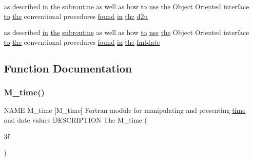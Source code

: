 \begin{DoxyCompactItemize}
\item 
as described \hyperlink{M__journal_83_8txt_afce72651d1eed785a2132bee863b2f38}{in} \hyperlink{M__stopwatch_83_8txt_a0f266597de2e57eb3aa964927bb30e14}{the} \hyperlink{M__stopwatch_83_8txt_acfbcff50169d691ff02d4a123ed70482}{subroutine} as well as how \hyperlink{M__stopwatch_83_8txt_a97209fd3e34ef701c0a9734280779cbb}{to} \hyperlink{intro__blas1_83_8txt_a04fa2694d85f67a675bb3f45f7241f48}{use} \hyperlink{M__stopwatch_83_8txt_a0f266597de2e57eb3aa964927bb30e14}{the} Object Oriented interface \hyperlink{M__stopwatch_83_8txt_a97209fd3e34ef701c0a9734280779cbb}{to} \hyperlink{M__stopwatch_83_8txt_a0f266597de2e57eb3aa964927bb30e14}{the} conventional procedures \hyperlink{what__overview_81_8txt_a4a5cd559ce9a19bdc777ce034bc845d1}{found} \hyperlink{M__journal_83_8txt_afce72651d1eed785a2132bee863b2f38}{in} \hyperlink{M__stopwatch_83_8txt_a0f266597de2e57eb3aa964927bb30e14}{the} \hyperlink{M__time_83_8txt_ab56b0f002a88dac7ff0ec59238e7aad2}{d2u}
\item 
as described \hyperlink{M__journal_83_8txt_afce72651d1eed785a2132bee863b2f38}{in} \hyperlink{M__stopwatch_83_8txt_a0f266597de2e57eb3aa964927bb30e14}{the} \hyperlink{M__stopwatch_83_8txt_acfbcff50169d691ff02d4a123ed70482}{subroutine} as well as how \hyperlink{M__stopwatch_83_8txt_a97209fd3e34ef701c0a9734280779cbb}{to} \hyperlink{intro__blas1_83_8txt_a04fa2694d85f67a675bb3f45f7241f48}{use} \hyperlink{M__stopwatch_83_8txt_a0f266597de2e57eb3aa964927bb30e14}{the} Object Oriented interface \hyperlink{M__stopwatch_83_8txt_a97209fd3e34ef701c0a9734280779cbb}{to} \hyperlink{M__stopwatch_83_8txt_a0f266597de2e57eb3aa964927bb30e14}{the} conventional procedures \hyperlink{what__overview_81_8txt_a4a5cd559ce9a19bdc777ce034bc845d1}{found} \hyperlink{M__journal_83_8txt_afce72651d1eed785a2132bee863b2f38}{in} \hyperlink{M__stopwatch_83_8txt_a0f266597de2e57eb3aa964927bb30e14}{the} \hyperlink{M__time_83_8txt_ad50a7c3c69e1d5931a0518d62cff1ee8}{fmtdate}
\end{DoxyCompactItemize}


\subsection{Function Documentation}
\mbox{\label{M__time_83_8txt_af632c02871a2248b5e1d01c3e3293704}} 
\subsubsection{\texorpdfstring{M\+\_\+time()}{M\_time()}\hspace{0.1cm}{\footnotesize\ttfamily [1/2]}}
{\footnotesize\ttfamily N\+A\+ME M\+\_\+time \mbox{[}M\+\_\+time\mbox{]} Fortran module for manipulating and presenting \hyperlink{M__stopwatch_83_8txt_a1091fdf3a4e66042d1571c7e4ade98dd}{time} and date values D\+E\+S\+C\+R\+I\+P\+T\+I\+ON The M\+\_\+time (\begin{DoxyParamCaption}\item[{3f}]{ }\end{DoxyParamCaption})}

